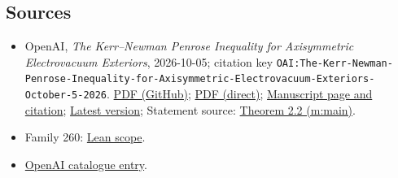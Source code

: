 \documentclass[11pt]{article}
\begin{document}
\subsection{Sources}
\begin{itemize}
\item OpenAI, \emph{The Kerr–Newman Penrose Inequality for Axisymmetric Electrovacuum Exteriors}, 2026-10-05; citation key \texttt{OAI:The-Kerr-Newman-Penrose-Inequality-for-Axisymmetric-Electrovacuum-Exteriors-October-5-2026}. \href{https://github.com/openai/math/blob/adc7f1241b42e322a6451854ab7e4b4c146bf78a/preprints/The-Kerr-Newman-Penrose-Inequality-for-Axisymmetric-Electrovacuum-Exteriors-October-5-2026/paper.pdf}{PDF (GitHub)}; \href{https://github.com/openai/math/raw/adc7f1241b42e322a6451854ab7e4b4c146bf78a/preprints/The-Kerr-Newman-Penrose-Inequality-for-Axisymmetric-Electrovacuum-Exteriors-October-5-2026/paper.pdf}{PDF (direct)}; \href{https://github.com/openai/math/blob/adc7f1241b42e322a6451854ab7e4b4c146bf78a/preprints/The-Kerr-Newman-Penrose-Inequality-for-Axisymmetric-Electrovacuum-Exteriors-October-5-2026/README.md}{Manuscript page and citation}; \href{https://github.com/openai/math/blob/main/preprints/The-Kerr-Newman-Penrose-Inequality-for-Axisymmetric-Electrovacuum-Exteriors-October-5-2026/paper.pdf}{Latest version}; Statement source: \href{https://github.com/openai/math/blob/adc7f1241b42e322a6451854ab7e4b4c146bf78a/preprints/The-Kerr-Newman-Penrose-Inequality-for-Axisymmetric-Electrovacuum-Exteriors-October-5-2026/build/main.tex\#L293}{Theorem 2.2 (m:main)}.
\item Family 260: \href{https://github.com/openai/math/blob/adc7f1241b42e322a6451854ab7e4b4c146bf78a/lean/docs/260.md}{Lean scope}.
\item \href{https://github.com/openai/math/blob/adc7f1241b42e322a6451854ab7e4b4c146bf78a/CONTENTS.md}{OpenAI catalogue entry}.
\end{itemize}
\end{document}
